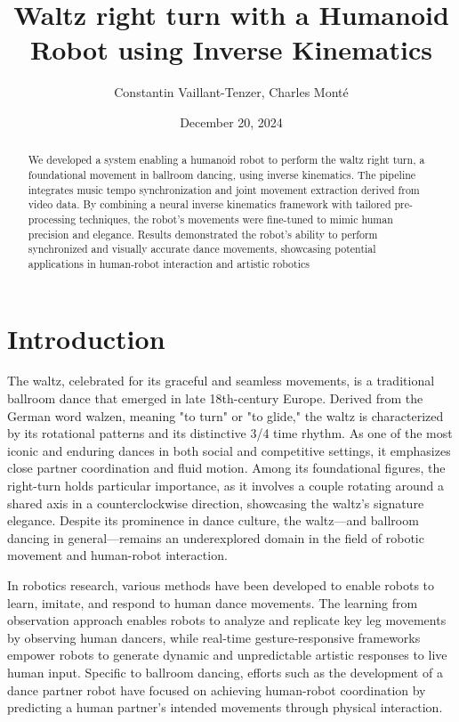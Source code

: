 \documentclass{amsart}
\date{December 20, 2024}
\title{Waltz right turn with a Humanoid Robot using Inverse Kinematics}
\author{Constantin Vaillant-Tenzer, Charles Monté}
\theoremstyle{definition}
\theoremstyle{plain}
\begin{document}
\maketitle

\begin{abstract}
  We developed a system enabling a humanoid robot to perform the waltz right turn, 
  a foundational movement in ballroom dancing, using inverse kinematics. 
  The pipeline integrates music tempo synchronization and joint movement extraction derived from video data. 
  By combining a neural inverse kinematics framework with tailored pre-processing techniques, 
  the robot's movements were fine-tuned to mimic human precision and elegance. 
  Results demonstrated the robot's ability to perform synchronized and visually accurate dance movements, 
  showcasing potential applications in human-robot interaction and artistic robotics
\end{abstract}


\section{Introduction}

The waltz, celebrated for its graceful and seamless movements, is a traditional ballroom dance that emerged in late 18th-century Europe. Derived from the German word walzen, meaning "to turn" or "to glide," the waltz is characterized by its rotational patterns and its distinctive 3/4 time rhythm. As one of the most iconic and enduring dances in both social and competitive settings, it emphasizes close partner coordination and fluid motion. Among its foundational figures, the right-turn holds particular importance, as it involves a couple rotating around a shared axis in a counterclockwise direction, showcasing the waltz's signature elegance. Despite its prominence in dance culture, the waltz—and ballroom dancing in general—remains an underexplored domain in the field of robotic movement and human-robot interaction.

In robotics research, various methods have been developed to enable robots to learn, imitate, and respond to human dance movements. The learning from observation approach \cite{traditional_jap_dance} enables robots to analyze and replicate key leg movements by observing human dancers, while real-time gesture-responsive frameworks \cite{spectacle_imitation} empower robots to generate dynamic and unpredictable artistic responses to live human input. Specific to ballroom dancing, efforts such as the development of a dance partner robot \cite{ballroom_dance} have focused on achieving human-robot coordination by predicting a human partner's intended movements through physical interaction.
\end{document}
